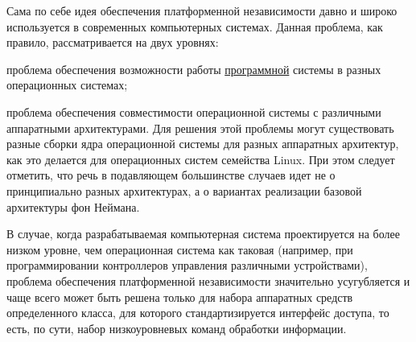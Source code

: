 Сама по себе идея обеспечения платформенной независимости давно и широко используется в современных компьютерных системах. Данная проблема, как правило, рассматривается на двух уровнях:
\begin{textitemize}
	\item проблема обеспечения возможности работы \uline{программной} системы в разных операционных системах;
	\item проблема обеспечения совместимости операционной системы с различными аппаратными архитектурами. Для решения этой проблемы могут существовать разные сборки ядра операционной системы для разных аппаратных архитектур, как это делается для операционных систем семейства Linux. При этом следует отметить, что речь в подавляющем большинстве случаев идет не о принципиально разных архитектурах, а о вариантах реализации базовой архитектуры фон Неймана.
\end{textitemize}

В случае, когда разрабатываемая компьютерная система проектируется на более низком уровне, чем операционная система как таковая (например, при программировании контроллеров управления различными устройствами), проблема обеспечения платформенной независимости значительно усугубляется и чаще всего может быть решена только для набора аппаратных средств определенного класса, для которого стандартизируется интерфейс доступа, то есть, по сути, набор низкоуровневых команд обработки информации.


